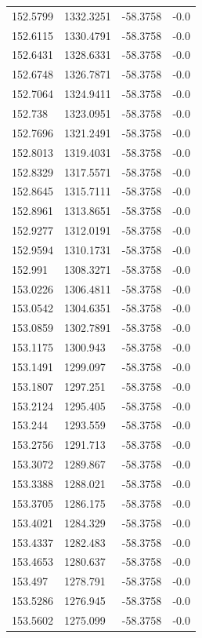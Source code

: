 \begin{table}[H]
\begin{tabular}{llll}
152.5799 & 1332.3251 & -58.3758 & -0.0 \\
152.6115 & 1330.4791 & -58.3758 & -0.0 \\
152.6431 & 1328.6331 & -58.3758 & -0.0 \\
152.6748 & 1326.7871 & -58.3758 & -0.0 \\
152.7064 & 1324.9411 & -58.3758 & -0.0 \\
152.738 & 1323.0951 & -58.3758 & -0.0 \\
152.7696 & 1321.2491 & -58.3758 & -0.0 \\
152.8013 & 1319.4031 & -58.3758 & -0.0 \\
152.8329 & 1317.5571 & -58.3758 & -0.0 \\
152.8645 & 1315.7111 & -58.3758 & -0.0 \\
152.8961 & 1313.8651 & -58.3758 & -0.0 \\
152.9277 & 1312.0191 & -58.3758 & -0.0 \\
152.9594 & 1310.1731 & -58.3758 & -0.0 \\
152.991 & 1308.3271 & -58.3758 & -0.0 \\
153.0226 & 1306.4811 & -58.3758 & -0.0 \\
153.0542 & 1304.6351 & -58.3758 & -0.0 \\
153.0859 & 1302.7891 & -58.3758 & -0.0 \\
153.1175 & 1300.943 & -58.3758 & -0.0 \\
153.1491 & 1299.097 & -58.3758 & -0.0 \\
153.1807 & 1297.251 & -58.3758 & -0.0 \\
153.2124 & 1295.405 & -58.3758 & -0.0 \\
153.244 & 1293.559 & -58.3758 & -0.0 \\
153.2756 & 1291.713 & -58.3758 & -0.0 \\
153.3072 & 1289.867 & -58.3758 & -0.0 \\
153.3388 & 1288.021 & -58.3758 & -0.0 \\
153.3705 & 1286.175 & -58.3758 & -0.0 \\
153.4021 & 1284.329 & -58.3758 & -0.0 \\
153.4337 & 1282.483 & -58.3758 & -0.0 \\
153.4653 & 1280.637 & -58.3758 & -0.0 \\
153.497 & 1278.791 & -58.3758 & -0.0 \\
153.5286 & 1276.945 & -58.3758 & -0.0 \\
153.5602 & 1275.099 & -58.3758 & -0.0 \\

\end{tabular}
\end{table}
